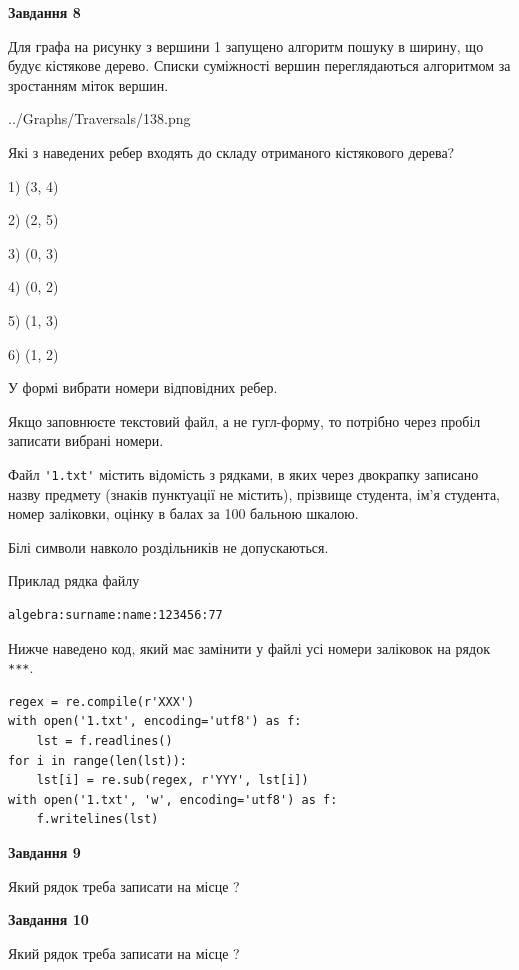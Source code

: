 \documentclass[12pt, ukrainian]{article}
\def\code#1{\Verb!#1!}
\begin{document}
{\begin {large}
{\begin {center}\textbf{Завдання 8}\end {center}}\par
Для графа на рисунку з вершини 1 запущено алгоритм пошуку в ширину, що будує кістякове дерево. Списки суміжності вершин переглядаються алгоритмом за зростанням міток вершин.\par
\begin{center}
	{../Graphs/Traversals/138.png}
\end{center}
\par Які з наведених ребер входять до складу отриманого кістякового дерева?\par
1) (3, 4)\par
2) (2, 5)\par
3) (0, 3)\par
4) (0, 2)\par
5) (1, 3)\par
6) (1, 2)\par
{\vskip 15pt} У формі вибрати номери відповідних ребер.


Якщо заповнюєте текстовий файл, а не гугл-форму, то потрібно через пробіл записа\-ти вибрані номери.\par
\newpage


Файл \code{'1.txt'} містить відомість з рядками, в яких через двокрапку записа\-но назву предмету (знаків пунктуації не містить), прізвище студента, ім'я студента, номер залі\-ков\-ки, оцінку в балах за 100 бальною шкалою.

Білі символи навколо роздільників не допускаються.

Приклад рядка файлу



\begin{verbatim}
algebra:surname:name:123456:77
\end{verbatim}


Нижче наведено код, який має замінити у файлі усі номери заліковок на рядок \code{***}.



\begin{verbatim}
regex = re.compile(r'XXX')
with open('1.txt', encoding='utf8') as f:
    lst = f.readlines()
for i in range(len(lst)):
    lst[i] = re.sub(regex, r'YYY', lst[i])
with open('1.txt', 'w', encoding='utf8') as f:
    f.writelines(lst)
\end{verbatim}




{\begin {center}\textbf{Завдання 9}\end {center}}\par
Який рядок треба записати на місце  ?\par
\vspace{5mm}


{\begin {center}\textbf{Завдання 10}\end {center}}\par
Який рядок треба записати на місце  ?\par


\newpage


\end {large}}
\end{document}
